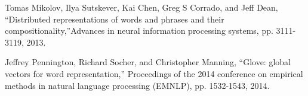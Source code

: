 \documentclass[conference]{IEEEtran}
\begin{document}
\begin{thebibliography}{00}
 Tomas Mikolov, Ilya Sutskever, Kai Chen, Greg S Corrado, and Jeff Dean, \textquotedblleft Distributed representations of words and phrases and their compositionality,\textquotedblright \hspace{1mm}Advances in neural information processing systems, pp. 3111-3119, 2013. 

 Jeffrey Pennington, Richard Socher, and Christopher Manning, \textquotedblleft Glove: global vectors for word representation,\textquotedblright \hspace{1mm} Proceedings of the 2014 conference on empirical methods in natural language processing (EMNLP), pp. 1532-1543, 2014.

\end{thebibliography}
\end{document}
